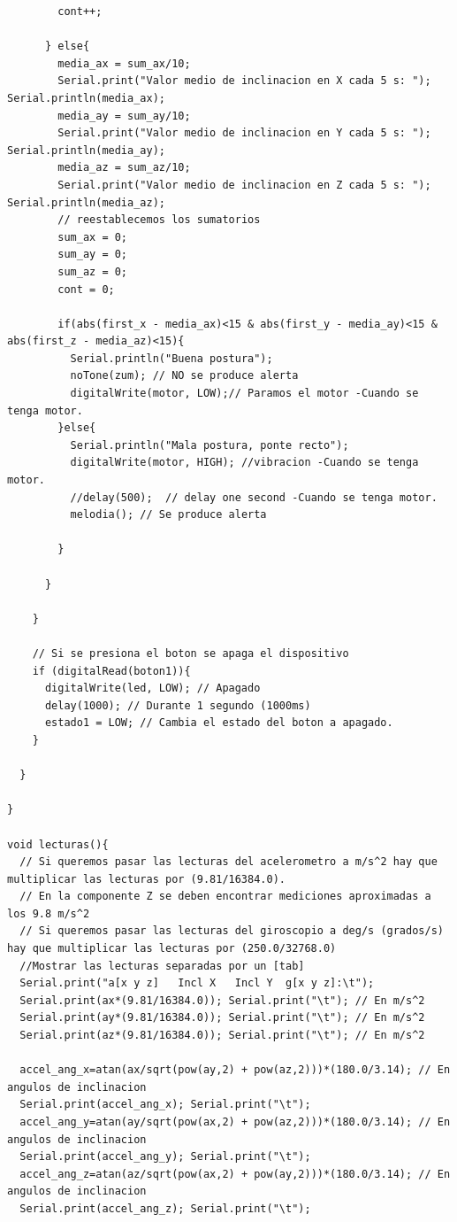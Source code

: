 \begin{lstlisting}
        cont++;

      } else{
        media_ax = sum_ax/10;
        Serial.print("Valor medio de inclinacion en X cada 5 s: "); Serial.println(media_ax);
        media_ay = sum_ay/10;
        Serial.print("Valor medio de inclinacion en Y cada 5 s: "); Serial.println(media_ay);
        media_az = sum_az/10;
        Serial.print("Valor medio de inclinacion en Z cada 5 s: "); Serial.println(media_az);
        // reestablecemos los sumatorios
        sum_ax = 0; 
        sum_ay = 0; 
        sum_az = 0; 
        cont = 0;

        if(abs(first_x - media_ax)<15 & abs(first_y - media_ay)<15 & abs(first_z - media_az)<15){
          Serial.println("Buena postura");
          noTone(zum); // NO se produce alerta
          digitalWrite(motor, LOW);// Paramos el motor -Cuando se tenga motor.
        }else{
          Serial.println("Mala postura, ponte recto");
          digitalWrite(motor, HIGH); //vibracion -Cuando se tenga motor.
          //delay(500);  // delay one second -Cuando se tenga motor.
          melodia(); // Se produce alerta
          
        }

      }

    } 

    // Si se presiona el boton se apaga el dispositivo
    if (digitalRead(boton1)){
      digitalWrite(led, LOW); // Apagado
      delay(1000); // Durante 1 segundo (1000ms)
      estado1 = LOW; // Cambia el estado del boton a apagado.
    }
    
  }

}

void lecturas(){
  // Si queremos pasar las lecturas del acelerometro a m/s^2 hay que multiplicar las lecturas por (9.81/16384.0). 
  // En la componente Z se deben encontrar mediciones aproximadas a los 9.8 m/s^2 
  // Si queremos pasar las lecturas del giroscopio a deg/s (grados/s) hay que multiplicar las lecturas por (250.0/32768.0) 
  //Mostrar las lecturas separadas por un [tab] 
  Serial.print("a[x y z]   Incl X   Incl Y  g[x y z]:\t"); 
  Serial.print(ax*(9.81/16384.0)); Serial.print("\t"); // En m/s^2
  Serial.print(ay*(9.81/16384.0)); Serial.print("\t"); // En m/s^2
  Serial.print(az*(9.81/16384.0)); Serial.print("\t"); // En m/s^2

  accel_ang_x=atan(ax/sqrt(pow(ay,2) + pow(az,2)))*(180.0/3.14); // En angulos de inclinacion
  Serial.print(accel_ang_x); Serial.print("\t"); 
  accel_ang_y=atan(ay/sqrt(pow(ax,2) + pow(az,2)))*(180.0/3.14); // En angulos de inclinacion
  Serial.print(accel_ang_y); Serial.print("\t"); 
  accel_ang_z=atan(az/sqrt(pow(ax,2) + pow(ay,2)))*(180.0/3.14); // En angulos de inclinacion
  Serial.print(accel_ang_z); Serial.print("\t"); 
  

\end{lstlisting}
